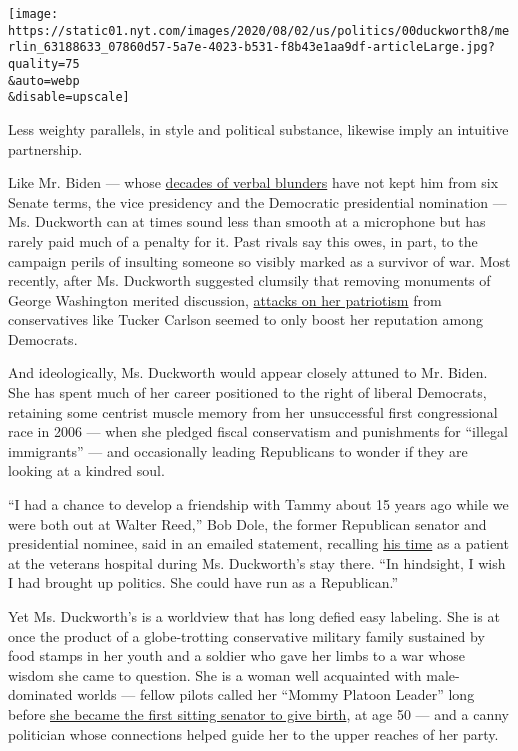 \texttt{[image: https://static01.nyt.com/images/2020/08/02/us/politics/00duckworth8/merlin\_63188633\_07860d57-5a7e-4023-b531-f8b43e1aa9df-articleLarge.jpg?quality=75\\\&auto=webp\\\&disable=upscale]}

Less weighty parallels, in style and political substance, likewise imply
an intuitive partnership.

Like Mr. Biden --- whose
\href{https://www.nytimes.com/2019/10/30/us/politics/joe-biden-debate-gaffes.html}{decades
of verbal blunders} have not kept him from six Senate terms, the vice
presidency and the Democratic presidential nomination --- Ms. Duckworth
can at times sound less than smooth at a microphone but has rarely paid
much of a penalty for it. Past rivals say this owes, in part, to the
campaign perils of insulting someone so visibly marked as a survivor of
war. Most recently, after Ms. Duckworth suggested clumsily that removing
monuments of George Washington merited discussion,
\href{https://www.nytimes.com/2020/07/08/us/politics/tucker-carlson-tammy-duckworth.html}{attacks
on her patriotism} from conservatives like Tucker Carlson seemed to only
boost her reputation among Democrats.

And ideologically, Ms. Duckworth would appear closely attuned to Mr.
Biden. She has spent much of her career positioned to the right of
liberal Democrats, retaining some centrist muscle memory from her
unsuccessful first congressional race in 2006 --- when she pledged
fiscal conservatism and punishments for ``illegal immigrants'' --- and
occasionally leading Republicans to wonder if they are looking at a
kindred soul.

``I had a chance to develop a friendship with Tammy about 15 years ago
while we were both out at Walter Reed,'' Bob Dole, the former Republican
senator and presidential nominee, said in an emailed statement,
recalling
\href{https://www.nytimes.com/2005/04/10/politics/dole-discloses-emergency-that-nearly-took-his-life.html}{his
time} as a patient at the veterans hospital during Ms. Duckworth's stay
there. ``In hindsight, I wish I had brought up politics. She could have
run as a Republican.''

Yet Ms. Duckworth's is a worldview that has long defied easy labeling.
She is at once the product of a globe-trotting conservative military
family sustained by food stamps in her youth and a soldier who gave her
limbs to a war whose wisdom she came to question. She is a woman well
acquainted with male-dominated worlds --- fellow pilots called her
``Mommy Platoon Leader'' long before
\href{https://www.nytimes.com/2018/04/09/us/politics/tammy-duckworth-birth.html}{she
became the first sitting senator to give birth}, at age 50 --- and a
canny politician whose connections helped guide her to the upper reaches
of her party.

